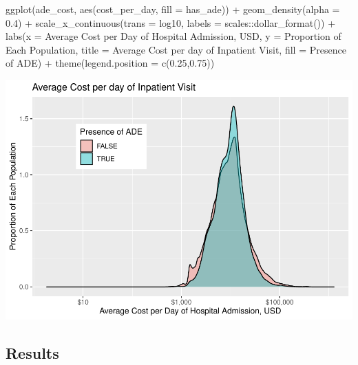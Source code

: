 \documentclass[preprint, 3p,
authoryear]{elsarticle} %
\newenvironment{Shaded}{\begin{snugshade}}{\end{snugshade}}
\newcommand{\AttributeTok}[1]{\textcolor[rgb]{0.77,0.63,0.00}{#1}}
\newcommand{\FloatTok}[1]{\textcolor[rgb]{0.00,0.00,0.81}{#1}}
\newcommand{\FunctionTok}[1]{\textcolor[rgb]{0.00,0.00,0.00}{#1}}
\newcommand{\NormalTok}[1]{#1}
\newcommand{\SpecialCharTok}[1]{\textcolor[rgb]{0.00,0.00,0.00}{#1}}
\newcommand{\StringTok}[1]{\textcolor[rgb]{0.31,0.60,0.02}{#1}}
\begin{document}
\begin{Shaded}
\begin{Highlighting}[]
\FunctionTok{ggplot}\NormalTok{(ade\_cost, }\FunctionTok{aes}\NormalTok{(cost\_per\_day, }\AttributeTok{fill =}\NormalTok{ has\_ade)) }\SpecialCharTok{+}
  \FunctionTok{geom\_density}\NormalTok{(}\AttributeTok{alpha =} \FloatTok{0.4}\NormalTok{) }\SpecialCharTok{+}
  \FunctionTok{scale\_x\_continuous}\NormalTok{(}\AttributeTok{trans =} \StringTok{\textquotesingle{}log10\textquotesingle{}}\NormalTok{, }\AttributeTok{labels =}\NormalTok{ scales}\SpecialCharTok{::}\FunctionTok{dollar\_format}\NormalTok{()) }\SpecialCharTok{+}
  \FunctionTok{labs}\NormalTok{(}\AttributeTok{x =} \StringTok{\textquotesingle{}Average Cost per Day of Hospital Admission, USD\textquotesingle{}}\NormalTok{, }\AttributeTok{y =} \StringTok{\textquotesingle{}Proportion of Each Population\textquotesingle{}}\NormalTok{, }\AttributeTok{title =} \StringTok{\textquotesingle{}Average Cost per day of Inpatient Visit\textquotesingle{}}\NormalTok{, }\AttributeTok{fill =} \StringTok{\textquotesingle{}Presence of ADE\textquotesingle{}}\NormalTok{) }\SpecialCharTok{+}
  \FunctionTok{theme}\NormalTok{(}\AttributeTok{legend.position =} \FunctionTok{c}\NormalTok{(}\FloatTok{0.25}\NormalTok{,}\FloatTok{0.75}\NormalTok{))}
\end{Highlighting}
\end{Shaded}

\includegraphics{final-project-paper_files/figure-latex/cost-per-day-plot-1.pdf}

\hypertarget{results}{%
\subsection{Results}\label{results}}
\end{document}
